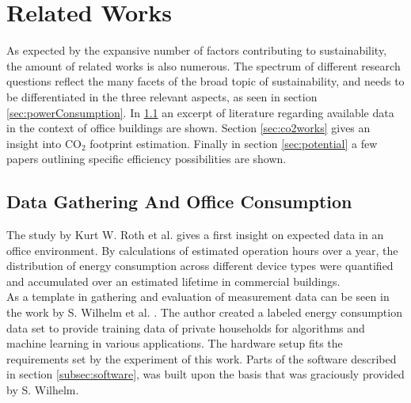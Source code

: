 \chapter{Related Works}\label{chap:relatedworks}
As expected by the expansive number of factors contributing to sustainability, the amount of related works is also numerous. The spectrum of different research questions reflect the many facets of the broad topic of sustainability, and needs to be differentiated in the three relevant aspects, as seen in section \ref{sec:powerConsumption}. In \ref{sec:officedata} an excerpt of literature regarding available data in the context of office buildings are shown. Section \ref{sec:co2works} gives an insight into CO$_2$ footprint estimation. Finally in section \ref{sec:potential} a few papers outlining specific efficiency possibilities are shown.
\section{Data Gathering And Office Consumption}\label{sec:officedata}
The study by Kurt W. Roth et al. \cite{roth} gives a first insight on expected data in an office environment. By calculations of estimated operation hours over a year, the distribution of energy consumption across different device types were quantified and accumulated over an estimated lifetime in commercial buildings.\\
As a template in gathering and evaluation of measurement data can be seen in the work by S. Wilhelm et al. \cite{wilhelm}. The author created a labeled energy consumption data set to provide training data of private households for algorithms and machine learning in various applications. The hardware setup fits the requirements set by the experiment of this work. Parts of the software described in section \ref{subsec:software}, was built upon the basis that was graciously provided by S. Wilhelm.

